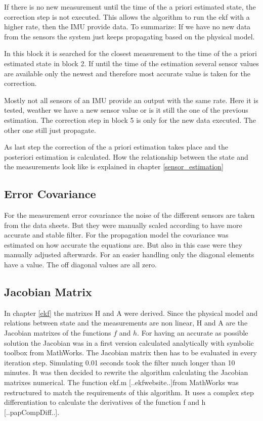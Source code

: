 \item[Block 3, measurement availability:]
If there is no new measurement until the time of the a priori estimated state, the correction step is not executed. This allows the algorithm to run the ekf with a higher rate, then the IMU provide data. To summarize: If we have no new data from the sensors the system just keeps propagating based on the physical model.

\item[Block 4, finding the closest measurement:]
In this block it is searched for the closest measurement to the time of the a priori estimated state in block 2. If until the time of the estimation several sensor values are available only the newest and therefore most accurate value is taken for the correction.

\item[Block 5, measurement selection:]
Mostly not all sensors of an IMU provide an output with the same rate. Here it is tested, weather we have a new sensor value or is it still the one of the previous estimation. The correction step in block 5 is only for the new data executed. The other one still just propagate.

\item[Block 6, correction:]
As last step the correction of the a priori estimation takes place and the posteriori estimation is calculated. How the relationship between the state and the measurements look like is explained in chapter \ref{sensor_estimation}

\subsection*{Error Covariance}
For the measurement error covariance the noise of the different sensors are taken from the data sheets. But  they were manually scaled according to have more accurate and stable filter. For the propagation model the covariance was estimated on how accurate the equations are. But also in this case were they manually adjusted afterwards. For an easier handling only the diagonal elements have a value. The off diagonal values are all zero.
\subsection*{Jacobian Matrix}
In chapter \ref{ekf} the matrixes H and A were derived. Since the physical model and relations between state and the measurements are non linear, H and A are the Jacobian matrixes of the functions $f$ and $h$. For having an accurate as possible solution the Jacobian was in a first version calculated analytically with symbolic toolbox from MathWorks. The Jacobian matrix then has to be evaluated in every iteration step. Simulating 0.01 seconds took the filter much longer than 10 minutes. It was then decided to rewrite the algorithm calculating the Jacobian matrixes numerical. The function ekf.m [..ekfwebsite..]from MathWorks was restructured to match the requirements of this algorithm. It uses a complex step differentiation to calculate the derivatives of the function f and h [..papCompDiff..]. 
